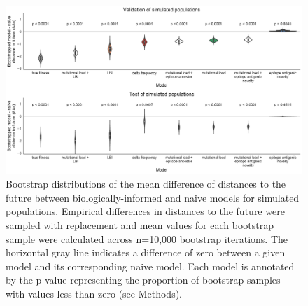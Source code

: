 \begin{figure}[H]
  \begin{center}
  \includegraphics[width=\textwidth]{figures/bootstrap_distributions_for_simulated_sample_3.pdf}
  \caption{
  Bootstrap distributions of the mean difference of distances to the future between biologically-informed and naive models for simulated populations.
  Empirical differences in distances to the future were sampled with replacement and mean values for each bootstrap sample were calculated across n=10,000 bootstrap iterations.
  The horizontal gray line indicates a difference of zero between a given model and its corresponding naive model.
  Each model is annotated by the p-value representing the proportion of bootstrap samples with values less than zero (see Methods).
  }
  \label{sup_fig:bootstrap_distributions_for_simulated_sample_3}
  \end{center}
\end{figure}

